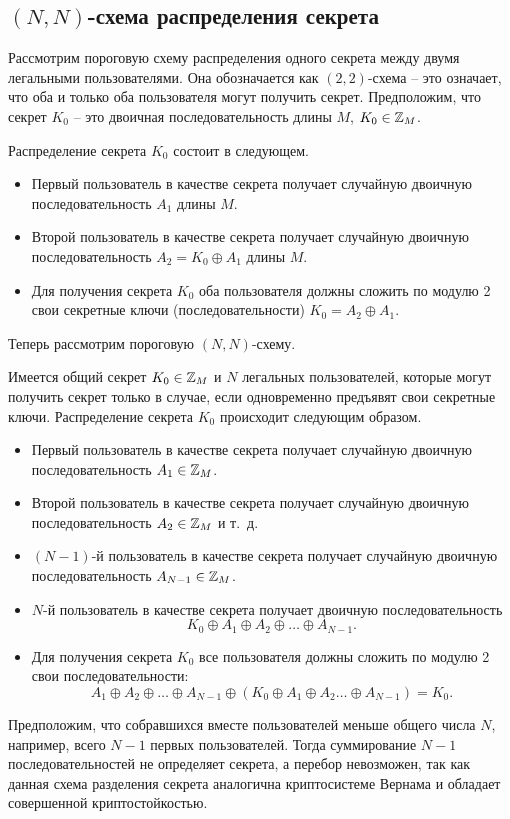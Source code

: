 \subsection[$(N, N)$-схема]{$(N, N)$-схема распределения секрета}

Рассмотрим пороговую схему распределения одного секрета между двумя легальными пользователями. Она обозначается как $(2,2)$-схема -- это означает, что оба и только оба пользователя могут получить секрет. Предположим, что секрет $K_{0}$ -- это двоичная последовательность длины $M$, $K_{0} \in \mathbb{Z}_{M}$.

Распределение секрета $K_{0}$ состоит в следующем.
\begin{itemize}
    \item Первый пользователь в качестве секрета получает случайную двоичную последовательность $A_{1}$ длины $M$.
    \item Второй пользователь в качестве секрета получает случайную двоичную последовательность $A_{2} =K_{0} \oplus A_{1}$ длины $M$.
    \item Для получения секрета $K_{0}$ оба пользователя должны сложить по модулю 2 свои секретные ключи (последовательности)  $K_{0} = A_{2} \oplus A_{1}$.
\end{itemize}

Теперь рассмотрим пороговую $(N,N)$-схему.

Имеется общий секрет $K_{0} \in \mathbb{Z}_{M}$ и $N$ легальных пользователей, которые могут получить секрет только в случае, если одновременно предъявят свои секретные ключи. Распределение секрета $K_{0}$ происходит следующим образом.

\begin{itemize}
    \item Первый пользователь в качестве секрета получает случайную двоичную последовательность $A_{1} \in \mathbb{Z}_{M}$.
    \item Второй пользователь в качестве секрета получает случайную двоичную последовательность $A_{2}\in \mathbb{Z}_{M}$ и т.~д.
    \item $(N-1)$-й пользователь в качестве секрета получает случайную двоичную последовательность $A_{N-1}\in \mathbb{Z}_{M}$.
    \item $N$-й пользователь в качестве секрета получает двоичную последовательность
        \[ K_0 \oplus A_1 \oplus A_2 \oplus \dots \oplus A_{N-1}. \]
    \item Для получения секрета $K_0$ все пользователя должны сложить по модулю 2 свои последовательности:
        \[ A_1 \oplus A_2 \oplus \dots \oplus A_{N-1} \oplus (K_0 \oplus A_1 \oplus A_2 \dots \oplus A_{N-1}) = K_0. \]
\end{itemize}

Предположим, что собравшихся вместе пользователей меньше общего числа $N$, например, всего $N-1$ первых пользователей. Тогда суммирование $N-1$ последовательностей не определяет секрета, а перебор невозможен, так как данная схема разделения секрета аналогична криптосистеме Вернама и обладает совершенной криптостойкостью.
